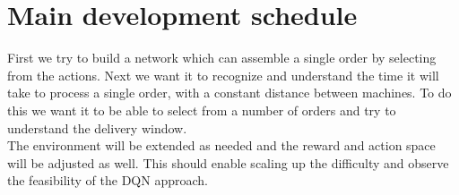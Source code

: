 \documentclass[runningheads,envcountsect]{llncs}
\begin{document}
\section{Main development schedule}
First we try to build a network which can assemble a single order by selecting from the actions. Next we want it to recognize and understand the time it will take to process a single order, with a constant distance between machines. To do this we want it to be able to select from a number of orders and try to understand the delivery window.\\
The environment will be extended as needed and the reward and action space will be adjusted as well. This should enable scaling up the difficulty and observe the feasibility of the DQN approach.


\vspace{24pt}



\end{document}
